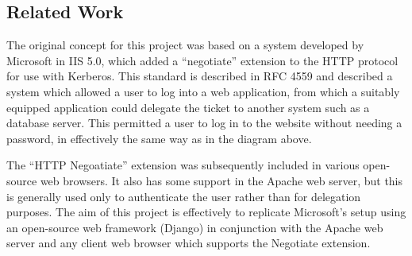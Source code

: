 \documentclass{article}
\begin{document}

\subsection{Related Work}
The original concept for this project was based on a system developed by Microsoft in IIS 5.0, which added a ``negotiate'' extension to the HTTP protocol for use with Kerberos. This standard is described in RFC 4559\cite{RFC4559} and described a system which allowed a user to log into a web application, from which a suitably equipped application could delegate the ticket to another system such as a database server. This permitted a user to log in to the website without needing a password, in effectively the same way as in the diagram above.

The ``HTTP Negoatiate'' extension was subsequently included in various open-source web browsers. It also has some support in the Apache web server, but this is generally used only to authenticate the user rather than for delegation purposes. The aim of this project is effectively to replicate Microsoft's setup using an open-source web framework (Django) in conjunction with the Apache web server and any client web browser which supports the Negotiate extension.
\end{document}
